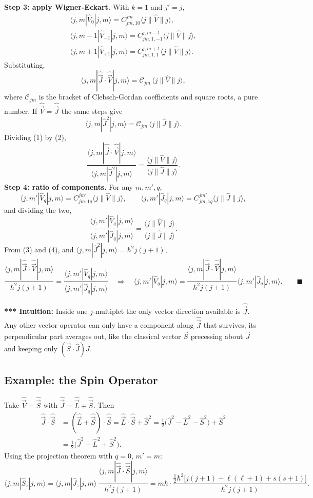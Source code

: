 \documentclass[11pt,a4paper]{article}
\begin{document}
\textbf{Step 3: apply Wigner-Eckart.} With $k=1$ and $j'=j$,
\begin{gather*}
\langle j,m|\hat V_0|j,m\rangle=C^{jm}_{jm,10}\langle j\|\hat V\|j\rangle,\\
\langle j,m-1|\hat V_{-1}|j,m\rangle=C^{j,m-1}_{jm,1,-1}\langle j\|\hat V\|j\rangle,\\
\langle j,m+1|\hat V_{+1}|j,m\rangle=C^{j,m+1}_{jm,1,1}\langle j\|\hat V\|j\rangle .
\end{gather*}
Substituting,
\[
\langle j,m|\hat{\vec J}\cdot\hat{\vec V}|j,m\rangle=\mathcal C_{jm}\,\langle j\|\hat V\|j\rangle,\tag{1}
\]
where $\mathcal C_{jm}$ is the bracket of Clebsch-Gordan coefficients and square roots, a pure number. If $\hat{\vec V}=\hat{\vec J}$ the same steps give
\[
\langle j,m|\hat J^2|j,m\rangle=\mathcal C_{jm}\,\langle j\|\hat J\|j\rangle.\tag{2}
\]
Dividing (1) by (2),
\[
\frac{\langle j,m|\hat{\vec J}\cdot\hat{\vec V}|j,m\rangle}{\langle j,m|\hat J^2|j,m\rangle}=\frac{\langle j\|\hat V\|j\rangle}{\langle j\|\hat J\|j\rangle}.\tag{3}
\]
\textbf{Step 4: ratio of components.} For any $m,m',q$,
\[
\langle j,m'|\hat V_q|j,m\rangle=C^{jm'}_{jm,1q}\langle j\|\hat V\|j\rangle,\qquad
\langle j,m'|\hat J_q|j,m\rangle=C^{jm'}_{jm,1q}\langle j\|\hat J\|j\rangle ,
\]
and dividing the two,
\[
\frac{\langle j,m'|\hat V_q|j,m\rangle}{\langle j,m'|\hat J_q|j,m\rangle}=\frac{\langle j\|\hat V\|j\rangle}{\langle j\|\hat J\|j\rangle}.\tag{4}
\]
From (3) and (4), and $\langle j,m|\hat J^2|j,m\rangle=\hbar^2j(j+1)$,
\[
\frac{\langle j,m|\hat{\vec J}\cdot\hat{\vec V}|j,m\rangle}{\hbar^2j(j+1)}=\frac{\langle j,m'|\hat V_q|j,m\rangle}{\langle j,m'|\hat J_q|j,m\rangle}
\quad\Longrightarrow\quad
\langle j,m'|\hat V_q|j,m\rangle=\frac{\langle j,m|\hat{\vec J}\cdot\hat{\vec V}|j,m\rangle}{\hbar^2j(j+1)}\langle j,m'|\hat J_q|j,m\rangle.\qquad\blacksquare
\]

\textbf{*** Intuition:} Inside one $j$-multiplet the only vector direction available is $\hat{\vec J}$. Any other vector operator can only have a component along $\hat{\vec J}$ that survives; its perpendicular part averages out, like the classical vector $\vec S$ precessing about $\vec J$ and keeping only $(\vec S\cdot\hat J)\hat J$.

\subsection{Example: the Spin Operator}
Take $\hat{\vec V}=\hat{\vec S}$ with $\hat{\vec J}=\hat{\vec L}+\hat{\vec S}$. Then
\begin{align*}
\hat{\vec J}\cdot\hat{\vec S}&=(\hat{\vec L}+\hat{\vec S})\cdot\hat{\vec S}=\hat{\vec L}\cdot\hat{\vec S}+\hat S^2=\tfrac12\big(\hat J^2-\hat L^2-\hat S^2\big)+\hat S^2\\
&=\tfrac12\big(\hat J^2-\hat L^2+\hat S^2\big).
\end{align*}
Using the projection theorem with $q=0$, $m'=m$:
\[
\langle j,m|\hat S_z|j,m\rangle=\langle j,m|\hat J_z|j,m\rangle\ \frac{\langle j,m|\hat{\vec J}\cdot\hat{\vec S}|j,m\rangle}{\hbar^2j(j+1)}
=m\hbar\cdot\frac{\tfrac12\hbar^2\big[j(j+1)-\ell(\ell+1)+s(s+1)\big]}{\hbar^2j(j+1)}.
\]
\end{document}
